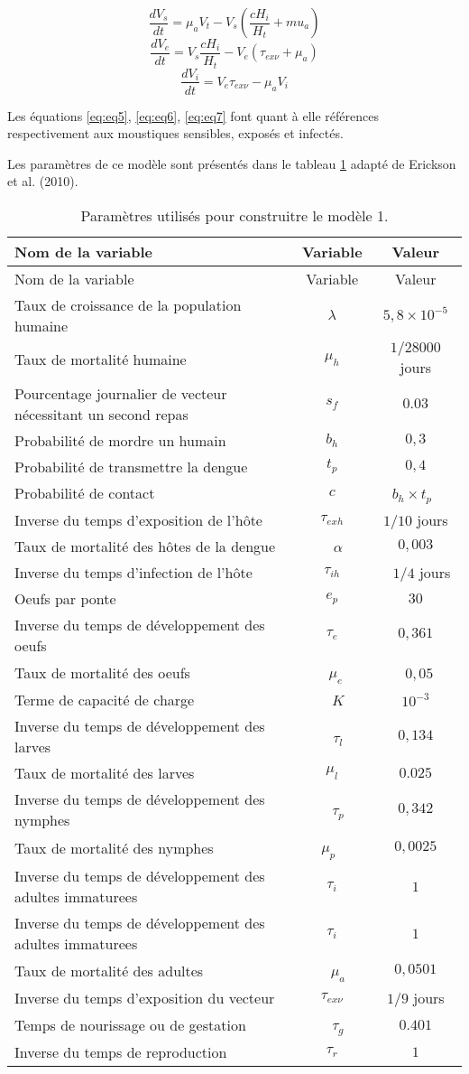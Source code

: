 \documentclass[
  12pt,
  oneside]{article}
\begin{document}
\begin{equation} \frac{dV_s}{dt} = \mu_aV_t - V_s \left(\frac{cH_i}{H_t} + mu_a\right)\label{eq:eq5}\end{equation}
\begin{equation} \frac{dV_e}{dt} = V_s \frac{cH_i}{H_t} - V_e \left(\tau_{ex\nu} + \mu_a\right)\label{eq:eq6}\end{equation}
\begin{equation} \frac{dV_i}{dt} = V_e\tau_{ex\nu} - \mu_aV_i \label{eq:eq7}\end{equation}

Les équations \ref{eq:eq5}, \ref{eq:eq6}, \ref{eq:eq7} font quant à elle
références respectivement aux moustiques sensibles, exposés et infectés.

Les paramètres de ce modèle sont présentés dans le tableau \ref{tbl:1}
adapté de Erickson et al. (2010).

\begin{longtable}[]{@{}lcc@{}}
\caption{Paramètres utilisés pour construitre le modèle 1.
\label{tbl:1}}\tabularnewline
\toprule
Nom de la variable & Variable & Valeur\tabularnewline
\midrule
\endfirsthead
\toprule
Nom de la variable & Variable & Valeur\tabularnewline
\midrule
\endhead
Taux de croissance de la population humaine & \(\lambda\) &
\(5,8\times 10^{-5}\)\tabularnewline
Taux de mortalité humaine & \(\mu_h\) & \(1/28000\) jours\tabularnewline
Pourcentage journalier de vecteur nécessitant un second repas & \(s_f\)
& \(0.03\)\tabularnewline
Probabilité de mordre un humain & \(b_h\) & \(0,3\)\tabularnewline
Probabilité de transmettre la dengue & \(t_p\) & \(0,4\)\tabularnewline
Probabilité de contact & \(c\) & \(b_h \times t_p\)~\tabularnewline
Inverse du temps d'exposition de l'hôte & \(\tau_{exh}\) & \(1/10\)
jours\tabularnewline
Taux de mortalité des hôtes de la dengue & ~ \(\alpha\) &
\(0,003\)\tabularnewline
Inverse du temps d'infection de l'hôte & \(\tau_{ih}\) & ~ \(1/4\)
jours\tabularnewline
Oeufs par ponte & \(e_p\) & \(30\)\tabularnewline
Inverse du temps de développement des oeufs & \(\tau_e\) &
\(0,361\)\tabularnewline
Taux de mortalité des oeufs & ~\(\mu_e\) & ~\(0,05\)\tabularnewline
Terme de capacité de charge & ~ \(K\) & \(10^{-3}\)\tabularnewline
Inverse du temps de développement des larves & ~ \(\tau_l\) &
\(0,134\)\tabularnewline
Taux de mortalité des larves & \(\mu_l\) & \(0.025\)\tabularnewline
Inverse du temps de développement des nymphes & ~ \(\tau_p\) &
\(0,342\)\tabularnewline
Taux de mortalité des nymphes & \(\mu_p\)~ & \(0,0025\)\tabularnewline
Inverse du temps de développement des adultes immaturees & \(\tau_i\) &
\(1\)\tabularnewline
Inverse du temps de développement des adultes immaturees & \(\tau_i\) &
\(1\)\tabularnewline
Taux de mortalité des adultes & ~ \(\mu_a\) & \(0,0501\)\tabularnewline
Inverse du temps d'exposition du vecteur & \(\tau_{ex\nu}\) & \(1/9\)
jours\tabularnewline
Temps de nourissage ou de gestation & ~ \(\tau_g\) &
\(0.401\)\tabularnewline
Inverse du temps de reproduction & \(\tau_r\) & \(1\)\tabularnewline
\bottomrule
\end{longtable}
\end{document}
